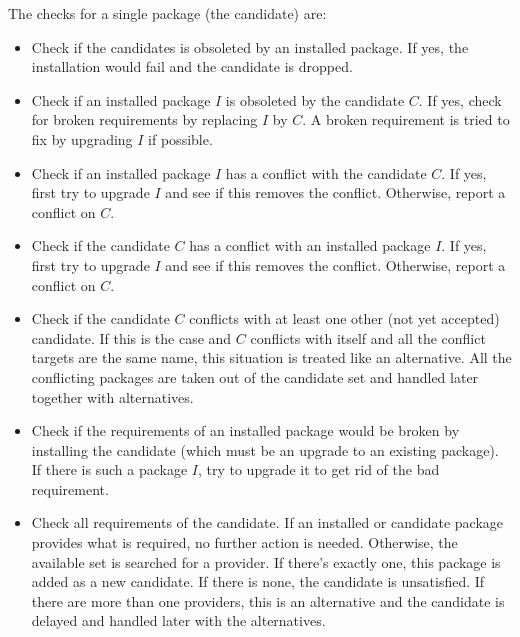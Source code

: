 \documentclass[10pt]{article}
\begin{document}
The checks for a single package (the candidate) are:
\begin{itemize}
\item
  Check if the candidates is obsoleted by an installed package. If
  yes, the installation would fail and the candidate is dropped.

\item
  Check if an installed package $I$ is obsoleted by the candidate $C$.
  If yes, check for broken requirements by replacing $I$ by $C$. A
  broken requirement is tried to fix by upgrading $I$ if possible.

\item
  Check if an installed package $I$ has a conflict with the candidate
  $C$. If yes, first try to upgrade $I$ and see if this removes the
  conflict. Otherwise, report a conflict on $C$.

\item
  Check if the candidate $C$ has a conflict with an installed package
  $I$. If yes, first try to upgrade $I$ and see if this removes the
  conflict. Otherwise, report a conflict on $C$.

\item
  Check if the candidate $C$ conflicts with at least one other (not
  yet accepted) candidate. If this is the case and $C$ conflicts with
  itself and all the conflict targets are the same name, this
  situation is treated like an alternative. All the conflicting
  packages are taken out of the candidate set and handled later
  together with alternatives.

\item
  Check if the requirements of an installed package would be broken by
  installing the candidate (which must be an upgrade to an existing
  package). If there is such a package $I$, try to upgrade it to get
  rid of the bad requirement.

\item
  Check all requirements of the candidate. If an installed or
  candidate package provides what is required, no further action is
  needed. Otherwise, the available set is searched for a provider. If
  there's exactly one, this package is added as a new candidate. If
  there is none, the candidate is unsatisfied. If there are more than
  one providers, this is an alternative and the candidate is delayed
  and handled later with the alternatives.
\end{itemize}
\end{document}
